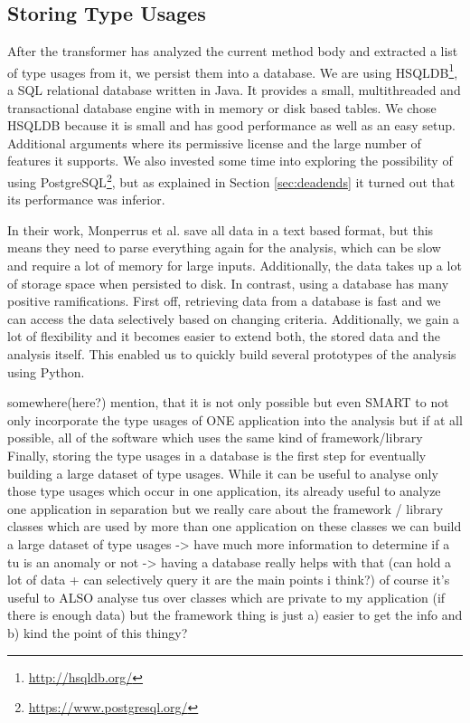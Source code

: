 \subsection{Storing Type Usages}

After the transformer has analyzed the current method body and extracted a list of type usages from it, we persist them into a database.
We are using HSQLDB\footnote{\url{http://hsqldb.org/}}, a SQL relational database written in Java.
It provides a small, multithreaded and transactional database engine with in memory or disk based tables.
We chose HSQLDB because it is small and has good performance as well as an easy setup.
Additional arguments where its permissive license and the large number of features it supports.
We also invested some time into exploring the possibility of using PostgreSQL\footnote{\url{https://www.postgresql.org/}}, but as explained in Section \ref{sec:deadends} it turned out that its performance was inferior.

In their work, Monperrus et al. save all data in a text based format, but this means they need to parse everything again for the analysis, which can be slow and require a lot of memory for large inputs.
Additionally, the data takes up a lot of storage space when persisted to disk.
In contrast, using a database has many positive ramifications.
First off, retrieving data from a database is fast and we can access the data selectively based on changing criteria.
Additionally, we gain a lot of flexibility and it becomes easier to extend both, the stored data and the analysis itself.
This enabled us to quickly build several prototypes of the analysis using Python.

somewhere(here?) mention, that it is not only possible but even SMART to not only incorporate the type usages of ONE application into the analysis but if at all possible, all of the software which uses the same kind of framework/library
Finally, storing the type usages in a database is the first step for eventually building a large dataset of type usages.
While it can be useful to analyse only those type usages which occur in one application, 
its already useful to analyze one application in separation
but we really care about the framework / library classes which are used by more than one application
on these classes we can build a large dataset of type usages -> have much more information to determine if a tu is an anomaly or not
-> having a database really helps with that (can hold a lot of data + can selectively query it are the main points i think?)
of course it's useful to ALSO analyse tus over classes which are private to my application (if there is enough data)
    but the framework thing is just a) easier to get the info and b) kind the point of this thingy?

